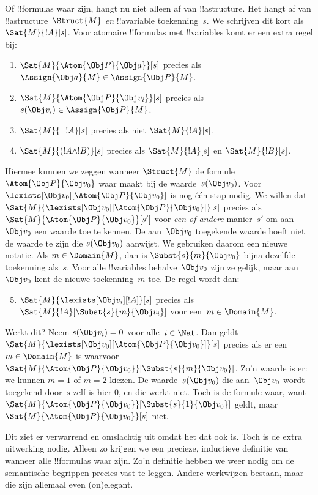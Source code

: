 \documentclass[../../../include/open-logic-section]{subfiles}
\begin{document}
Of !!{formula}s waar zijn, hangt nu niet alleen af van
!!a{structure}. Het hangt af van !!a{structure}~$\Struct{M}$ \emph{en}
!!a{variable} toekenning~$s$. We schrijven dit kort als
$\Sat{M}{!A}[s]$. Voor atomaire !!{formula}s met !!{variable}s komt er
een extra regel bij:
\begin{enumerate}
  \item $\Sat{M}{\Atom{\Obj P}{\Obj a}}[s]$ precies als
  $\Assign{\Obj a}{M} \in \Assign{\Obj P}{M}$.
  \item $\Sat{M}{\Atom{\Obj P}{\Obj v_i}}[s]$ precies als
  $s(\Obj v_i) \in \Assign{\Obj P}{M}$.
  \item $\Sat{M}{\lnot !A}[s]$ precies als niet $\Sat{M}{!A}[s]$.
  \item $\Sat{M}{(!A \land !B)}[s]$ precies als $\Sat{M}{!A}[s]$ en $\Sat{M}{!B}[s]$.
\end{enumerate}
Hiermee kunnen we zeggen wanneer $\Struct{M}$ de formule
$\Atom{\Obj P}{\Obj v_0}$ waar maakt bij de waarde~$s(\Obj v_0)$. Voor
$\lexists[\Obj v_0][\Atom{\Obj P}{\Obj v_0}]$ is nog één stap nodig.
We willen dat $\Sat{M}{\lexists[\Obj v_0][\Atom{\Obj P}{\Obj
v_0}]}[s]$ precies als $\Sat{M}{\Atom{\Obj P}{\Obj v_0}}[s']$ voor
\emph{een of andere} manier~$s'$ om aan~$\Obj v_0$ een waarde toe te
kennen. De aan~$\Obj v_0$ toegekende waarde hoeft niet de waarde te zijn
die $s(\Obj v_0)$ aanwijst. We gebruiken daarom een nieuwe notatie. Als
$m \in \Domain{M}$, dan is $\Subst{s}{m}{\Obj v_0}$ bijna dezelfde
toekenning als~$s$. Voor alle !!{variable}s behalve~$\Obj v_0$ zijn ze
gelijk, maar aan $\Obj v_0$ kent de nieuwe toekenning~$m$ toe. De regel
wordt dan:
\begin{enumerate}\setcounter{enumi}{4}
  \item $\Sat{M}{\lexists[\Obj v_i][!A]}[s]$ precies als
  $\Sat{M}{!A}[\Subst{s}{m}{\Obj v_i}]$ voor een~$m \in \Domain{M}$.
\end{enumerate}
Werkt dit? Neem $s(\Obj v_i) = 0$ voor alle~$i \in \Nat$. Dan geldt
$\Sat{M}{\lexists[\Obj v_0][\Atom{\Obj P}{\Obj v_0}]}[s]$ precies als
er een $m \in \Domain{M}$ is waarvoor
$\Sat{M}{\Atom{\Obj P}{\Obj v_0}}[\Subst{s}{m}{\Obj v_0}]$. Zo'n waarde
is er: we kunnen $m = 1$ of $m = 2$ kiezen. De waarde~$s(\Obj v_0)$
die aan~$\Obj v_0$ wordt toegekend door~$s$ zelf is hier $0$, en die
werkt niet. Toch is de formule
waar, want
$\Sat{M}{\Atom{\Obj P}{\Obj v_0}}[\Subst{s}{1}{\Obj v_0}]$ geldt,
maar $\Sat{M}{\Atom{\Obj P}{\Obj v_0}}[s]$ niet.

Dit ziet er verwarrend en omslachtig uit omdat het dat ook is. Toch is
de extra uitwerking nodig. Alleen zo krijgen we een precieze,
inductieve definitie van wanneer alle !!{formula}s waar zijn. Zo'n
definitie hebben we weer nodig om de semantische begrippen precies
vast te leggen. Andere werkwijzen bestaan, maar die zijn allemaal even
(on)elegant.
\end{document}
